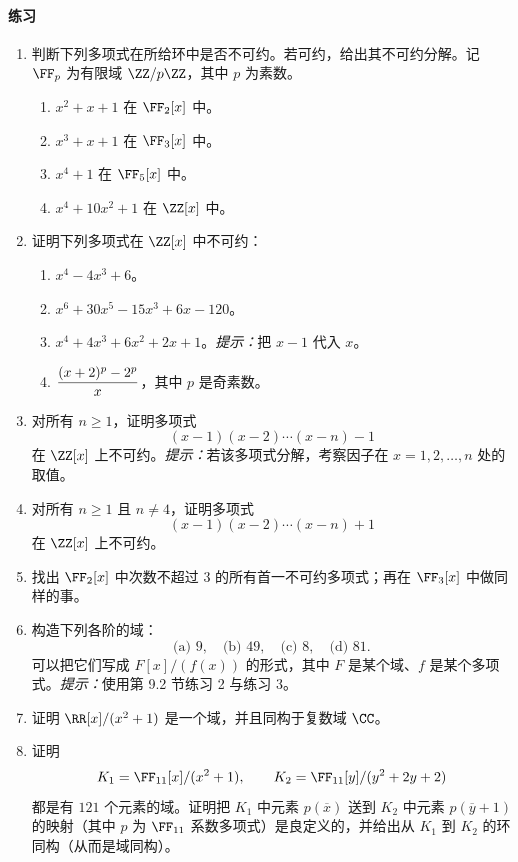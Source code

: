 \paragraph{练习}
\begin{enumerate}[label=\arabic*.]
	\item 判断下列多项式在所给环中是否不可约。若可约，给出其不可约分解。记 $\FF_p$ 为有限域 $\ZZ/p\ZZ$，其中 $p$ 为素数。
	\begin{enumerate}[label=(\alph*)]
		\item $x^2+x+1$ 在 $\FF_2[x]$ 中。
		\item $x^3+x+1$ 在 $\FF_3[x]$ 中。
		\item $x^4+1$ 在 $\FF_5[x]$ 中。
		\item $x^4+10x^2+1$ 在 $\ZZ[x]$ 中。
	\end{enumerate}
	
	\item 证明下列多项式在 $\ZZ[x]$ 中不可约：
	\begin{enumerate}[label=(\alph*)]
		\item $x^4-4x^3+6$。
		\item $x^6+30x^5-15x^3+6x-120$。
		\item $x^4+4x^3+6x^2+2x+1$。\emph{提示：}把 $x-1$ 代入 $x$。
		\item $\displaystyle { (x+2)^p-2^p\over x}$，其中 $p$ 是奇素数。
	\end{enumerate}
	
	\item 对所有 $n\geq1$，证明多项式
	\[
	(x-1)(x-2)\cdots(x-n)-1
	\]
	在 $\ZZ[x]$ 上不可约。\emph{提示：}若该多项式分解，考察因子在 $x=1,2,\ldots,n$ 处的取值。
	
	\item 对所有 $n\geq1$ 且 $n\neq4$，证明多项式
	\[
	(x-1)(x-2)\cdots(x-n)+1
	\]
	在 $\ZZ[x]$ 上不可约。
	
	\item 找出 $\FF_2[x]$ 中次数不超过 $3$ 的所有首一不可约多项式；再在 $\FF_3[x]$ 中做同样的事。
	
	\item 构造下列各阶的域：
	\[
	\text{(a) }9,\quad \text{(b) }49,\quad \text{(c) }8,\quad \text{(d) }81.
	\]
	可以把它们写成 $F[x]/(f(x))$ 的形式，其中 $F$ 是某个域、$f$ 是某个多项式。\emph{提示：}使用第 9.2 节练习 2 与练习 3。
	
	\item 证明 $\RR[x]/(x^2+1)$ 是一个域，并且同构于复数域 $\CC$。
	
	\item 证明
	\[
	K_1=\FF_{11}[x]/(x^2+1),
	\qquad K_2=\FF_{11}[y]/(y^2+2y+2)
	\]
	都是有 $121$ 个元素的域。证明把 $K_1$ 中元素 $p(\overline{x})$ 送到 $K_2$ 中元素 $p(\overline{y}+1)$ 的映射（其中 $p$ 为 $\FF_{11}$ 系数多项式）是良定义的，并给出从 $K_1$ 到 $K_2$ 的环同构（从而是域同构）。
	

\end{enumerate}

